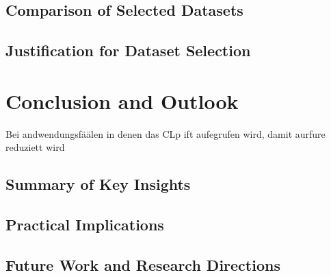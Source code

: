 \section{Comparison of Selected Datasets}
\section{Justification for Dataset Selection}

\chapter{Conclusion and Outlook}
Bei andwendungsfäälen in denen das CLp ift aufegrufen wird, damit aurfure reduziett wird
\section{Summary of Key Insights}
\section{Practical Implications}
\section{Future Work and Research Directions}
